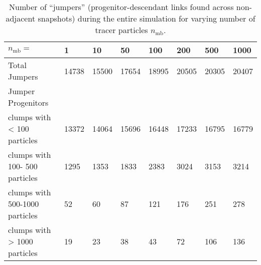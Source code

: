 \begin{table*}
  \caption{Number of ``jumpers'' (progenitor-descendant links found
    across non-adjacent snapshots) during the entire simulation for
    varying number of tracer particles $n_{\mathrm{mb}}$.  }
  \label{tab:jumpers}
  {\small

\begin{tabular}[c]{l | p{0.9cm} | p{0.9cm} | p{0.9cm} | p{0.9cm} | p{0.9cm} | p{0.9cm} | p{0.9cm} |}
    $n_{\mathrm{mb}}=$                   & 1           & 10          & 50          & 100         &
    200         & 500         & 1000        \\
\hline
    Total Jumpers                   &    14738    &    15500    &    17654    &    18995    &
    20505    &    20305    &    20407    \\
\hline
    Jumper Progenitors & & & & & & & \\
    clumps with <  100 particles    &    13372    &    14064    &    15696    &    16448    &
    17233    &    16795    &    16779    \\
    clumps with  100- 500 particles &     1295    &     1353    &     1833    &     2383    &
    3024    &     3153    &     3214    \\
    clumps with  500-1000 particles &       52    &       60    &       87    &      121    &
    176    &      251    &      278    \\
    clumps with > 1000 particles    &       19    &       23    &       38    &       43    &
    72    &      106    &      136    \\
\hline
\end{tabular}


} %
\end{table*}
